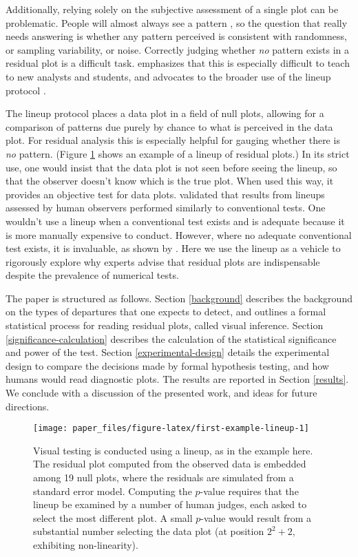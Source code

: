 \documentclass[]{interact}
\theoremstyle{plain}%
\theoremstyle{definition}
\theoremstyle{remark}
\begin{document}
Additionally, relying solely on the subjective assessment of a single
plot can be problematic. People will almost always see a pattern
\citep[see][]{kahneman2011thinking}, so the question that really needs
answering is whether any pattern perceived is consistent with
randomness, or sampling variability, or noise. Correctly judging whether
\emph{no} pattern exists in a residual plot is a difficult task.
\cite{loy2021bringing} emphasizes that this is especially difficult to
teach to new analysts and students, and advocates to the broader use of
the lineup protocol \citep{bujastatistical2009}.

The lineup protocol places a data plot in a field of null plots,
allowing for a comparison of patterns due purely by chance to what is
perceived in the data plot. For residual analysis this is especially
helpful for gauging whether there is \emph{no} pattern. (Figure
\ref{fig:first-example-lineup} shows an example of a lineup of residual
plots.) In its strict use, one would insist that the data plot is not
seen before seeing the lineup, so that the observer doesn't know which
is the true plot. When used this way, it provides an objective test for
data plots. \cite{majumdervalidation2013} validated that results from
lineups assessed by human observers performed similarly to conventional
tests. One wouldn't use a lineup when a conventional test exists and is
adequate because it is more manually expensive to conduct. However,
where no adequate conventional test exists, it is invaluable, as shown
by \cite{loy2013diagnostic}. Here we use the lineup as a vehicle to
rigorously explore why experts advise that residual plots are
indispensable despite the prevalence of numerical tests.

The paper is structured as follows. Section \ref{background} describes
the background on the types of departures that one expects to detect,
and outlines a formal statistical process for reading residual plots,
called visual inference. Section \ref{significance-calculation}
describes the calculation of the statistical significance and power of
the test. Section \ref{experimental-design} details the experimental
design to compare the decisions made by formal hypothesis testing, and
how humans would read diagnostic plots. The results are reported in
Section \ref{results}. We conclude with a discussion of the presented
work, and ideas for future directions.

\begin{figure}[t!]

{\centering \texttt{[image: paper\_files/figure-latex/first-example-lineup-1]} 

}

\caption{Visual testing is conducted using a lineup, as in the example here. The residual plot computed from the observed data is embedded among 19 null plots, where the residuals are simulated from a standard error model. Computing the $p$-value requires that the lineup be examined by a number of human judges, each asked to select the most different plot. A small $p$-value would result from a substantial number selecting the data plot (at position $2^2 + 2$, exhibiting non-linearity).}\label{fig:first-example-lineup}
\end{figure}
\end{document}
